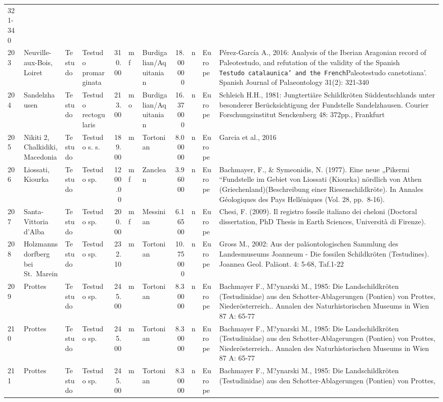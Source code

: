 \begin{landscape}
{\begin{longtable}[]{@{}llllrllrlll@{}}
	321-340\tabularnewline
	203 & Neuville-aux-Bois, Loiret & Testudo & Testudo promarginata &
	310.00 & mf & Burdigalian/Aquitanian & 18.00000 & n & Europe &
	Pérez-García A., 2016: Analysis of the Iberian Aragonian record of
	Paleotestudo, and refutation of the validity of the Spanish
	\texttt{Testudo\ catalaunica'\ and\ the\ French}Paleotestudo
	canetotiana'. Spanish Journal of Palaeontology 31(2):
	321-340\tabularnewline
	204 & Sandelzhausen & Testudo & Testudo rectogularis & 213.00 & mo &
	Burdigalian/Aquitanian & 16.37000 & n & Europe & Schleich H.H., 1981:
	Jungtertiäre Schildkröten Süddeutschlands unter besonderer
	Berücksichtigung der Fundstelle Sandelzhausen. Courier
	Forschungsinstitut Senckenberg 48: 372pp., Frankfurt\tabularnewline
	205 & Nikiti 2, Chalkidiki, Macedonia & Testudo & Testudo s. s. & 189.00
	& m & Tortonian & 8.00000 & n & Europe & Garcia et al.,
	2016\tabularnewline
	206 & Liossati, Kiourka & Testudo & Testudo sp. & 1200.00 & mf &
	Zanclean & 3.96000 & n & Europe & Bachmayer, F., \& Symeonidis, N.
	(1977). Eine neue „Pikermi ``Fundstelle im Gebiet von Liossati (Kiourka)
	nördlich von Athen (Griechenland)(Beschreibung einer Riesenschildkröte).
	In Annales Géologiques des Pays Helléniques (Vol. 28,
	pp.~8-16).\tabularnewline
	207 & Santa-Vittoria d'Alba & Testudo & Testudo sp. & 200.00 & mf &
	Messinian & 6.16500 & n & Europe & Chesi, F. (2009). Il registro fossile
	italiano dei cheloni (Doctoral dissertation, PhD Thesis in Earth
	Sciences, Università di Firenze).\tabularnewline
	208 & Holzmannsdorfberg bei St.~Marein & Testudo & Testudo sp. & 232.10
	& m & Tortonian & 10.75000 & n & Europe & Gross M., 2002: Aus der
	paläontologischen Sammlung des Landesmuseums Joanneum - Die fossilen
	Schildkröten (Testudines). Joannea Geol. Paläont. 4: 5-68,
	Taf.1-22\tabularnewline
	209 & Prottes & Testudo & Testudo sp. & 245.00 & m & Tortonian & 8.30000
	& n & Europe & Bachmayer F., M?ynarski M., 1985: Die Landschildkröten
	(Testudinidae) aus den Schotter-Ablagerungen (Pontien) von Prottes,
	Niederösterreich.. Annalen des Naturhistorischen Museums in Wien 87 A:
	65-77\tabularnewline
	210 & Prottes & Testudo & Testudo sp. & 245.00 & m & Tortonian & 8.30000
	& n & Europe & Bachmayer F., M?ynarski M., 1985: Die Landschildkröten
	(Testudinidae) aus den Schotter-Ablagerungen (Pontien) von Prottes,
	Niederösterreich.. Annalen des Naturhistorischen Museums in Wien 87 A:
	65-77\tabularnewline
	211 & Prottes & Testudo & Testudo sp. & 245.00 & m & Tortonian & 8.30000
	& n & Europe & Bachmayer F., M?ynarski M., 1985: Die Landschildkröten
	(Testudinidae) aus den Schotter-Ablagerungen (Pontien) von Prottes,

\end{longtable}}
\end{landscape}

